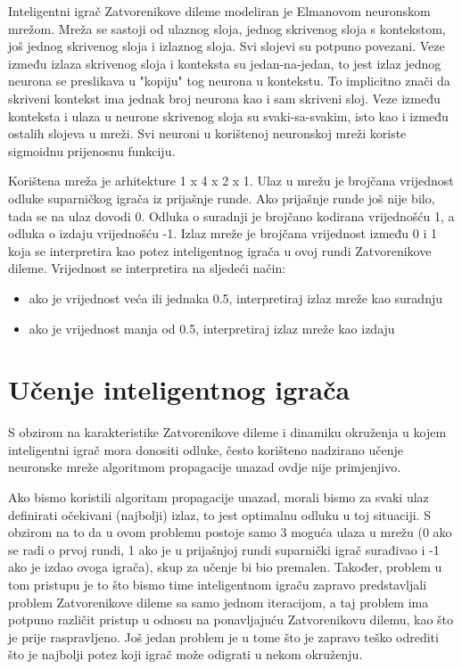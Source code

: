 \documentclass[zavrsnirad]{fer}
\begin{document}
	Inteligentni igrač Zatvorenikove dileme modeliran je Elmanovom neuronskom mrežom. Mreža se sastoji od ulaznog sloja, jednog skrivenog sloja s kontekstom, još jednog skrivenog sloja i izlaznog sloja. Svi slojevi su potpuno povezani. Veze između izlaza skrivenog sloja i konteksta su jedan-na-jedan, to jest izlaz jednog neurona se preslikava u "kopiju" tog neurona u kontekstu. To implicitno znači da skriveni kontekst ima jednak broj neurona kao i sam skriveni sloj. Veze između konteksta i ulaza u neurone skrivenog sloja su svaki-sa-svakim, isto kao i između ostalih slojeva u mreži. Svi neuroni u korištenoj neuronskoj mreži koriste sigmoidnu prijenosnu funkciju.
	
	Korištena mreža je arhitekture 1 x 4 x 2 x 1. Ulaz u mrežu je brojčana vrijednost odluke suparničkog igrača iz prijašnje runde. Ako prijašnje runde još nije bilo, tada se na ulaz dovodi 0. Odluka o suradnji je brojčano kodirana vrijednošću 1, a odluka o izdaju vrijednošću -1. Izlaz mreže je brojčana vrijednost između 0 i 1 koja se interpretira kao potez inteligentnog igrača u ovoj rundi Zatvorenikove dileme. Vrijednost se interpretira na sljedeći način:
	\begin{itemize}
		\item ako je vrijednost veća ili jednaka 0.5, interpretiraj izlaz mreže kao suradnju
		\item ako je vrijednost manja od 0.5, interpretiraj izlaz mreže kao izdaju
	\end{itemize}

	\section{Učenje inteligentnog igrača}
	\label{pog:Ucenje}
	
	S obzirom na karakteristike Zatvorenikove dileme i dinamiku okruženja u kojem inteligentni igrač mora donositi odluke, često korišteno nadzirano učenje neuronske mreže algoritmom propagacije unazad ovdje nije primjenjivo.
	
	Ako bismo koristili algoritam propagacije unazad, morali bismo za svaki ulaz definirati očekivani (najbolji) izlaz, to jest optimalnu odluku u toj situaciji. S obzirom na to da u ovom problemu postoje samo 3 moguća ulaza u mrežu (0 ako se radi o prvoj rundi, 1 ako je u prijašnjoj rundi suparnički igrač surađivao i -1 ako je izdao ovoga igrača), skup za učenje bi bio premalen. Također, problem u tom pristupu je to što bismo time inteligentnom igraču zapravo predstavljali problem Zatvorenikove dileme sa samo jednom iteracijom, a taj problem ima potpuno različit pristup u odnosu na ponavljajuću Zatvorenikovu dilemu, kao što je prije raspravljeno. Još jedan problem je u tome što je zapravo teško odrediti što je najbolji potez koji igrač može odigrati u nekom okruženju. 
	
\end{document}
